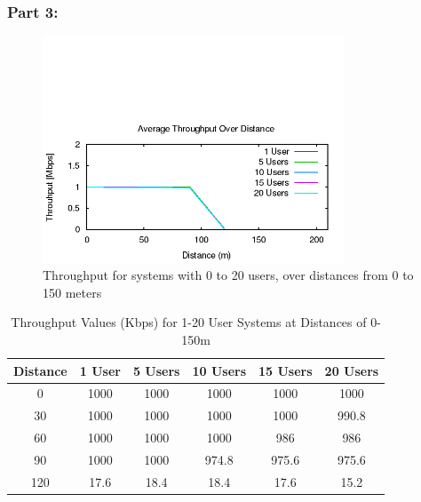 \subsubsection{Part 3:}

\begin{figure}[H]
	\centering
	\includegraphics[width=0.8\textwidth]{images/EE500/QC/P3/Images/wifi-throughput}
	\caption{Throughput for systems with 0 to 20 users, over distances from
	0 to 150 meters}
	\label{fig:QCP3throughput}
\end{figure}

\begin{table}[H]
	\centering
	\caption{Throughput Values (Kbps) for 1-20 User Systems at Distances of 0-150m}
	\label{tab:QCP3TPTable}
	\begin{tabular}{|c|c|c|c|c|c|}
		\hline
		Distance & 1 User & 5 Users & 10 Users & 15 Users & 20 Users\\
		\hline
		0 & 1000 & 1000 & 1000 & 1000 & 1000\\
		30 & 1000 & 1000 & 1000 & 1000 & 990.8\\
		60 & 1000 & 1000 & 1000 & 986 & 986\\
		90 & 1000 & 1000 & 974.8 & 975.6 & 975.6\\
		120 & 17.6 & 18.4 & 18.4 & 17.6 & 15.2\\
		\hline
	\end{tabular}
\end{table}

